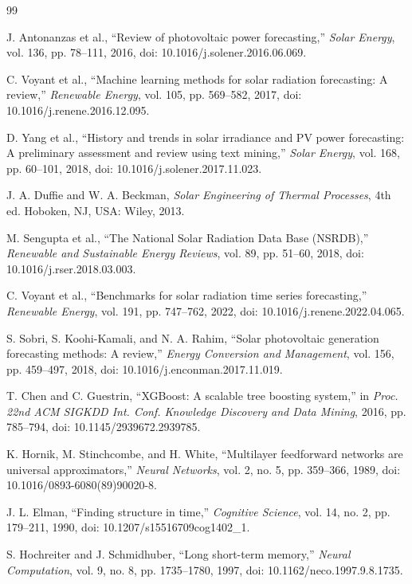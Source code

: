 \documentclass[10pt,conference,a4paper]{IEEEtran}
\begin{document}
\balance
\begin{thebibliography}{99}

J. Antonanzas et al., ``Review of photovoltaic power forecasting,''
\textit{Solar Energy}, vol. 136, pp. 78--111, 2016,
doi: 10.1016/j.solener.2016.06.069.

C. Voyant et al., ``Machine learning methods for solar radiation forecasting:
A review,'' \textit{Renewable Energy}, vol. 105, pp. 569--582, 2017,
doi: 10.1016/j.renene.2016.12.095.

D. Yang et al., ``History and trends in solar irradiance and PV power
forecasting: A preliminary assessment and review using text mining,''
\textit{Solar Energy}, vol. 168, pp. 60--101, 2018,
doi: 10.1016/j.solener.2017.11.023.

J. A. Duffie and W. A. Beckman, \textit{Solar Engineering of Thermal
Processes}, 4th ed. Hoboken, NJ, USA: Wiley, 2013.

M. Sengupta et al., ``The National Solar Radiation Data Base (NSRDB),''
\textit{Renewable and Sustainable Energy Reviews}, vol. 89, pp. 51--60, 2018,
doi: 10.1016/j.rser.2018.03.003.

C. Voyant et al., ``Benchmarks for solar radiation time series forecasting,''
\textit{Renewable Energy}, vol. 191, pp. 747--762, 2022,
doi: 10.1016/j.renene.2022.04.065.

S. Sobri, S. Koohi-Kamali, and N. A. Rahim, ``Solar photovoltaic generation
forecasting methods: A review,'' \textit{Energy Conversion and Management},
vol. 156, pp. 459--497, 2018, doi: 10.1016/j.enconman.2017.11.019.

T. Chen and C. Guestrin, ``XGBoost: A scalable tree boosting system,'' in
\textit{Proc. 22nd ACM SIGKDD Int. Conf. Knowledge Discovery and Data Mining},
2016, pp. 785--794, doi: 10.1145/2939672.2939785.

K. Hornik, M. Stinchcombe, and H. White, ``Multilayer feedforward networks are
universal approximators,'' \textit{Neural Networks}, vol. 2, no. 5,
pp. 359--366, 1989, doi: 10.1016/0893-6080(89)90020-8.

J. L. Elman, ``Finding structure in time,'' \textit{Cognitive Science},
vol. 14, no. 2, pp. 179--211, 1990,
doi: 10.1207/s15516709cog1402\_1.

S. Hochreiter and J. Schmidhuber, ``Long short-term memory,''
\textit{Neural Computation}, vol. 9, no. 8, pp. 1735--1780, 1997,
doi: 10.1162/neco.1997.9.8.1735.


\end{thebibliography}
\end{document}
